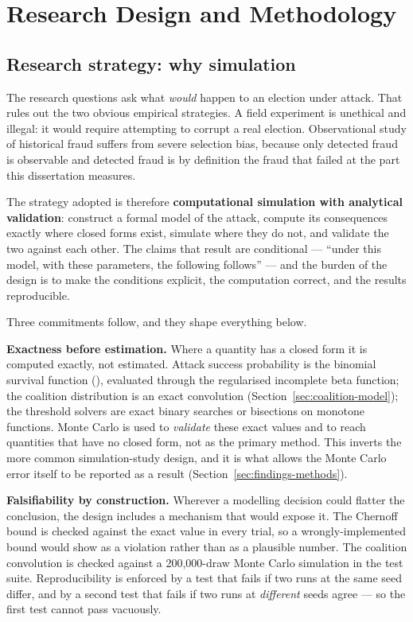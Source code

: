 \section{Research Design and Methodology}
\label{sec:methodology}

\subsection{Research strategy: why simulation}

The research questions ask what \emph{would} happen to an election
under attack. That rules out the two obvious empirical strategies. A
field experiment is unethical and illegal: it would require attempting
to corrupt a real election. Observational study of historical fraud
suffers from severe selection bias, because only detected fraud is
observable and detected fraud is by definition the fraud that failed at
the part this dissertation measures.

The strategy adopted is therefore \textbf{computational simulation with
analytical validation}: construct a formal model of the attack, compute
its consequences exactly where closed forms exist, simulate where they
do not, and validate the two against each other. The claims that result
are conditional --- ``under this model, with these parameters, the
following follows'' --- and the burden of the design is to make the
conditions explicit, the computation correct, and the results
reproducible.

Three commitments follow, and they shape everything below.

\textbf{Exactness before estimation.} Where a quantity has a closed
form it is computed exactly, not estimated. Attack success probability
is the binomial survival function
(), evaluated through the regularised incomplete beta
function; the coalition distribution is an exact convolution
(Section~\ref{sec:coalition-model}); the threshold solvers are exact
binary searches or bisections on monotone functions. Monte Carlo is
used to \emph{validate} these exact values and to reach quantities that
have no closed form, not as the primary method. This inverts the more
common simulation-study design, and it is what allows the Monte Carlo
error itself to be reported as a result
(Section~\ref{sec:findings-methods}).

\textbf{Falsifiability by construction.} Wherever a modelling decision
could flatter the conclusion, the design includes a mechanism that
would expose it. The Chernoff bound is checked against the exact value
in every trial, so a wrongly-implemented bound would show as a
violation rather than as a plausible number. The coalition convolution
is checked against a 200{,}000-draw Monte Carlo simulation in the test
suite. Reproducibility is enforced by a test that fails if two runs at
the same seed differ, and by a second test that fails if two runs at
\emph{different} seeds agree --- so the first test cannot pass
vacuously.

